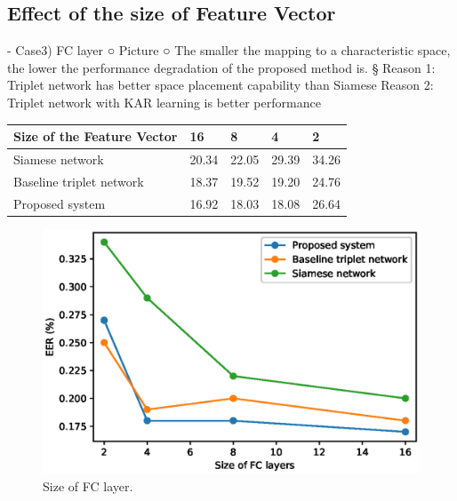 \subsection{Effect of the size of Feature Vector}
- Case3) FC layer
○ Picture
○ The smaller the mapping to a characteristic space, the lower the performance degradation of the proposed method is.
§ Reason 1: Triplet network has better space placement capability than Siamese
Reason 2: Triplet network with KAR learning is better performance

\begin{table}[]
    \centering
    \begin{tabular}{|l|l|l|l|l|}
    \hline
    Size of the Feature Vector & 16    & 8     & 4     & 2     \\ \hline
    Siamese network            & 20.34 & 22.05 & 29.39 & 34.26 \\ \hline
    Baseline triplet network   & 18.37 & 19.52 & 19.20 & 24.76 \\ \hline
    Proposed system            & 16.92 & 18.03 & 18.08 & 26.64 \\ \hline
    \end{tabular}
\end{table}
\begin{figure}[!ht]
    \includegraphics[width=\textwidth]{fclayer_v1.eps}
    \caption{Size of FC layer.} \label{fclayer}
\end{figure}

